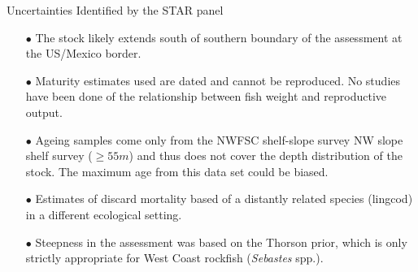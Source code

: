 \documentclass[ignorenonframetext,]{beamer}
\begin{document}
\begin{frame}{Uncertainties Identified by the STAR panel}

\begin{itemize}
\item[$\bullet$] The stock likely extends south of southern boundary of the assessment at the US/Mexico border.  
\item[$\bullet$] Maturity estimates used are dated and cannot be reproduced.  No studies have been done of the relationship between fish weight and reproductive output.
\item[$\bullet$] Ageing samples come only from the NWFSC shelf-slope survey NW slope shelf survey ($\geq 55 m$) and thus does not cover the depth distribution of the stock.  The maximum age from this data set could be biased. 
\item[$\bullet$] Estimates of discard mortality based of a distantly related species (lingcod) in a different ecological setting.
\item[$\bullet$] Steepness in the assessment was based on the Thorson prior, which is only strictly appropriate for West Coast rockfish (\emph{Sebastes} spp.). 
\end{itemize}

\end{frame}
\end{document}
